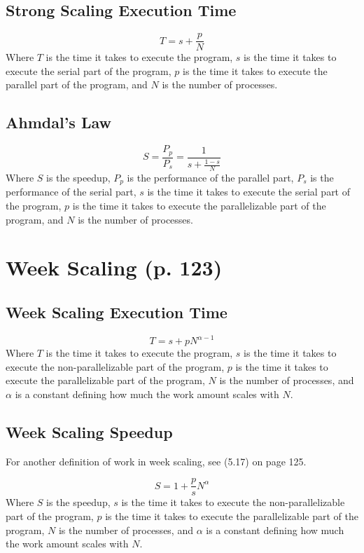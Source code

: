 \documentclass{article}
\begin{document}
		\subsection{Strong Scaling Execution Time}
			\begin{equation}
				T=s+\frac{p}{N}
			\end{equation}
			Where $T$ is the time it takes to execute the program, $s$ is the time it takes to execute the serial part of the program, $p$ is the time it takes to execute the parallel part of the program, and $N$ is the number of processes.

		\subsection{Ahmdal's Law}
			\begin{equation}
				S=\frac{P_p}{P_s}=\frac{1}{s+\frac{1-s}{N}}
			\end{equation}
			Where $S$ is the speedup, $P_p$ is the performance of the parallel part, $P_s$ is the performance of the serial part, $s$ is the time it takes to execute the serial part of the program, $p$ is the time it takes to execute the parallelizable part of the program, and $N$ is the number of processes.
	
	\section{Week Scaling (p. 123)}
		\subsection{Week Scaling Execution Time}
			\begin{equation}
				T=s+pN^{\alpha-1}
			\end{equation}
			Where $T$ is the time it takes to execute the program, $s$ is the time it takes to execute the non-parallelizable part of the program, $p$ is the time it takes to execute the parallelizable part of the program, $N$ is the number of processes, and $\alpha$ is a constant defining how much the work amount scales with $N$.

		\subsection{Week Scaling Speedup}
			For another definition of work in week scaling, see (5.17) on page 125.

			\begin{equation}
				S=1+\frac{p}{s}N^{\alpha}
			\end{equation}
			Where $S$ is the speedup, $s$ is the time it takes to execute the non-parallelizable part of the program, $p$ is the time it takes to execute the parallelizable part of the program, $N$ is the number of processes, and $\alpha$ is a constant defining how much the work amount scales with $N$.
\end{document}
